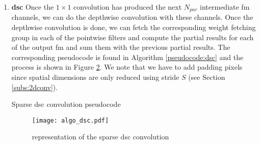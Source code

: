 \begin{enumerate}
\begin{figure}[H]
        \label{fig:algo_11conv}
    \end{figure}
    \item \textbf{\acrshort{dsc}} Once the $1 \times 1$ convolution has produced the next $N_{par}$ intermediate \acrshort{fm} channels, we can do the depthwise convolution with these channels. Once the depthwise convolution is done, we can fetch the corresponding weight fetching group in each of the pointwise filters and compute the partial results for each of the output \acrshort{fm} and sum them with the previous partial results. The corresponding pseudocode is found in Algorithm \ref{pseudocode:dsc} and the process is shown in Figure \ref{fig:algo_dsc}. We note that we have to add padding pixels since spatial dimensions are only reduced using stride $S$ (see Section \ref{subs:2dconv}).
    \begin{algorithm}[H]
        \centering
        \begin{algorithmic}
             
                 
                     
                         
                             
                                     
                            \EndFor
                        \EndFor
                    \EndFor
                     
                         
                        \EndFor
                    \EndFor
                \EndFor
            \EndFor
        \end{algorithmic}
        \caption{Sparse \acrshort{dsc} convolution pseudocode}
        \label{pseudocode:dsc}
    \end{algorithm}
    \begin{figure}[H]
        \centering
        \texttt{[image: algo\_dsc.pdf]}
        \caption{representation of the sparse \acrshort{dsc} convolution}
        \label{fig:algo_dsc}
    \end{figure}
\end{enumerate}
%
